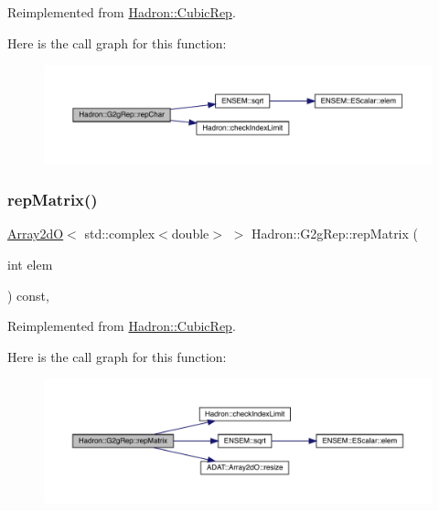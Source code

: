 Reimplemented from \mbox{\hyperlink{structHadron_1_1CubicRep_af45227106e8e715e84b0af69cd3b36f8}{Hadron\+::\+Cubic\+Rep}}.

Here is the call graph for this function\+:
\nopagebreak
\begin{figure}[H]
\begin{center}
\leavevmode
\includegraphics[width=350pt]{d9/d3e/structHadron_1_1G2gRep_ab31419c7383dac18c56c70f3ca7220a9_cgraph}
\end{center}
\end{figure}
\mbox{\label{structHadron_1_1G2gRep_af178c31ae966d7c1025673a0889b7f6f}} 
\subsubsection{\texorpdfstring{repMatrix()}{repMatrix()}\hspace{0.1cm}{\footnotesize\ttfamily [1/3]}}
{\footnotesize\ttfamily \mbox{\hyperlink{classADAT_1_1Array2dO}{Array2dO}}$<$ std\+::complex$<$double$>$ $>$ Hadron\+::\+G2g\+Rep\+::rep\+Matrix (\begin{DoxyParamCaption}\item[{int}]{elem }\end{DoxyParamCaption}) const\hspace{0.3cm}{\ttfamily [inline]}, {\ttfamily [virtual]}}



Reimplemented from \mbox{\hyperlink{structHadron_1_1CubicRep_ac5d7e9e6f4ab1158b5fce3e4ad9e8005}{Hadron\+::\+Cubic\+Rep}}.

Here is the call graph for this function\+:
\nopagebreak
\begin{figure}[H]
\begin{center}
\leavevmode
\includegraphics[width=350pt]{d9/d3e/structHadron_1_1G2gRep_af178c31ae966d7c1025673a0889b7f6f_cgraph}
\end{center}
\end{figure}
\mbox{\label{structHadron_1_1G2gRep_af178c31ae966d7c1025673a0889b7f6f}} 
